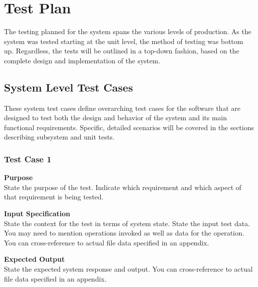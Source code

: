 \documentclass[12pt]{article}
\begin{document}

\section{Test Plan}

{
The testing planned for the system spans the various levels of production. As the system was tested starting at the unit level, the method of testing was bottom up. Regardless, the tests will be outlined in a top-down fashion, based on the complete design and implementation of the system. \\
}

\subsection{System Level Test Cases}

{
These system test cases define overarching test cases for the software that are designed to test both the design and behavior of the system and its main functional requirements. Specific, detailed scenarios will be covered in the sections describing subsystem and unit tests. \\
}

\subsubsection{Test Case 1} \label{tc:1}

\noindent
{\bf Purpose}\\
State the purpose of the test.
Indicate which requirement and which aspect of that requirement is being tested.

\noindent
{\bf Input Specification}\\
State the context for the test in terms of system state.
State the input test data. You may need to mention operations invoked as well as data for the operation.
You can cross-reference to actual file data specified in an appendix.

\noindent
{\bf Expected Output}\\
State the expected system response and output.
You can cross-reference to actual file data specified in an appendix.
\end{document}

